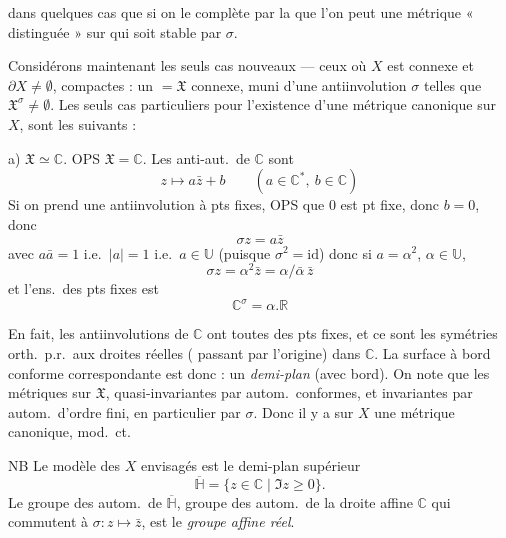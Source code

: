 \documentclass[11pt,a4paper]{article}
\begin{document}
\ill{} dans quelques cas que si on le complète par la  que l'on peut \ill{} une métrique « distinguée » sur  qui soit stable par $\sigma$.

Considérons maintenant les seuls cas nouveaux --- ceux où $X$ est connexe et $\partial X \neq \emptyset$, compactes : un  $= \mathfrak{X}$ connexe, muni d'une antiinvolution $\sigma$ telles que $\mathfrak{X}^{\sigma} \neq \emptyset$. Les seuls cas particuliers pour l'existence d'une métrique canonique sur $X$, sont les suivants :

a) $\mathfrak{X} \simeq \mathbb{C}$. \struck{\ill{}} OPS $\mathfrak{X} = \mathbb{C}$. Les anti-aut.\ de $\mathbb{C}$ sont
\[
  z \longmapsto a\bar{z} + b \qquad (a \in \mathbb{C}^{*},\ b \in \mathbb{C})
\]
Si on prend une antiinvolution à pts fixes, OPS que $0$ est pt fixe, donc $b = 0$, donc 
\[
  \sigma z = a\bar{z}
\]
avec $a\bar{a} = 1$ i.e.\ $|a| = 1$ i.e.\ $a \in \mathbb{U}$ (puisque $\sigma^{2} = \mathrm{id}$) donc  si $a = \alpha^{2}$, $\alpha \in \mathbb{U}$,
\[
  \sigma z = \alpha^{2}\bar{z} = \alpha/\bar{\alpha}\,\bar{z}
\]
et l'ens.\ des pts fixes est
\[
  \mathbb{C}^{\sigma} = \alpha.\mathbb{R}
\]

En fait, les antiinvolutions de $\mathbb{C}$ ont toutes des pts fixes, et ce sont les symétries orth.\ p.r.\ aux droites réelles ( passant par l'origine) dans $\mathbb{C}$. La surface à bord conforme correspondante est donc : un \emph{demi-plan} (avec bord). On note que les métriques sur $\mathfrak{X}$, quasi-invariantes par autom.\ conformes, et invariantes par autom.\ d'ordre fini, en particulier par $\sigma$. Donc il y a sur $X$ une  métrique canonique, mod.\ ct.

NB \struck{\ill{}} Le modèle des $X$ envisagés est le demi-plan supérieur \struck{\ill{}}
\[
  \overline{\mathbb{H}} = \{z \in \mathbb{C} \mid \Im z \geq 0\}.
\]
Le groupe des autom.\ de $\overline{\mathbb{H}}$,  groupe des autom.\ de la droite affine $\mathbb{C}$ qui commutent à $\sigma : z \mapsto \bar{z}$, est le \emph{groupe affine réel}.
\end{document}
